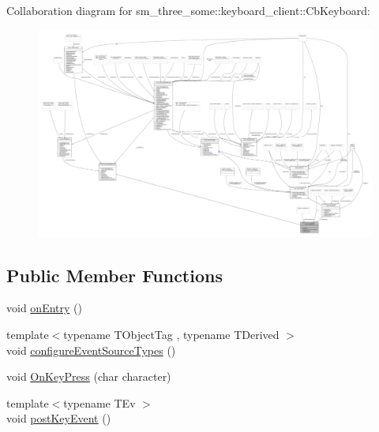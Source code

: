 Collaboration diagram for sm\+\_\+three\+\_\+some\+:\+:keyboard\+\_\+client\+:\+:Cb\+Keyboard\+:
\nopagebreak
\begin{figure}[H]
\begin{center}
\leavevmode
\includegraphics[width=350pt]{classsm__three__some_1_1keyboard__client_1_1CbKeyboard__coll__graph}
\end{center}
\end{figure}
\subsection*{Public Member Functions}
\begin{DoxyCompactItemize}
\item 
void \hyperlink{classsm__three__some_1_1keyboard__client_1_1CbKeyboard_a54134eab3d66d411af12a6b76acd6f3b}{on\+Entry} ()
\item 
{\footnotesize template$<$typename T\+Object\+Tag , typename T\+Derived $>$ }\\void \hyperlink{classsm__three__some_1_1keyboard__client_1_1CbKeyboard_a4b2245ee21c640cbb1956819595cc711}{configure\+Event\+Source\+Types} ()
\item 
void \hyperlink{classsm__three__some_1_1keyboard__client_1_1CbKeyboard_a8f2328c151b7e389cd5f79bbba6d9855}{On\+Key\+Press} (char character)
\item 
{\footnotesize template$<$typename T\+Ev $>$ }\\void \hyperlink{classsm__three__some_1_1keyboard__client_1_1CbKeyboard_ac4d9cfb76f7776aa0e1c204687e1c0cf}{post\+Key\+Event} ()
\end{DoxyCompactItemize}
